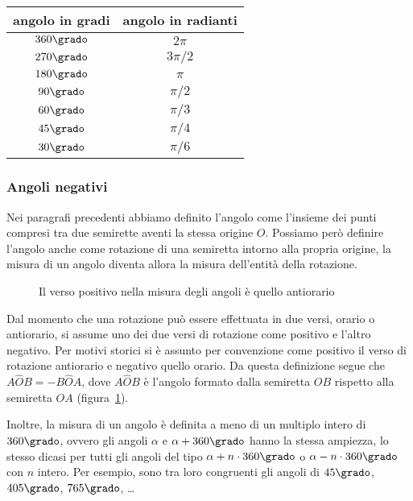 \begin{center}
\begin{tabular}{cc}
\toprule
angolo in gradi	& angolo in radianti\\
\midrule
$360\grado$ & $2\pi$\\
$270\grado$ & $3\pi/2$\\
$180\grado$ & $\pi$\\
$90\grado$ & $\pi/2$\\
$60\grado$ & $\pi/3$\\
$45\grado$ & $\pi/4$\\
$30\grado$ & $\pi/6$\\
\bottomrule
\end{tabular}
\end{center}

\subsubsection{Angoli negativi}

Nei paragrafi precedenti abbiamo definito l'angolo come l'insieme dei 
punti compresi tra due semirette aventi la stessa origine $O$. 
Possiamo però definire l'angolo anche come rotazione di una semiretta 
intorno alla propria origine, la misura di un angolo diventa allora 
la misura dell'entità della rotazione.


\begin{inaccessibleblock}
 \begin{figure}[!htb]
	\centering
	\caption{Il verso positivo nella misura degli angoli è quello 
antiorario}\label{fig:1.43}
\end{figure}
\end{inaccessibleblock}

Dal momento che una rotazione può essere effettuata in due versi, 
orario o antiorario, si assume uno dei due versi di rotazione come 
positivo e l'altro negativo. Per motivi storici si è assunto per 
convenzione come positivo il verso di rotazione antiorario e negativo 
quello orario.
Da questa definizione segue che $A\widehat{O}B = -B\widehat{O}A$, 
dove $A\widehat{O}B$ è l'angolo formato dalla semiretta $OB$ rispetto 
alla semiretta $OA$ (figura~\ref{fig:1.43}).

Inoltre, la misura di un angolo è definita a meno di un multiplo 
intero di $360\grado$, ovvero gli angoli $\alpha$ e 
$\alpha+360\grado$ hanno la stessa ampiezza, lo stesso dicasi per 
tutti gli angoli del tipo $\alpha+n\cdot 360\grado$ o $\alpha - 
n\cdot 360\grado$ con $n$ intero. Per esempio, sono tra loro 
congruenti gli angoli di $45\grado$, $405\grado$, $765\grado$, 
\ldots{}

